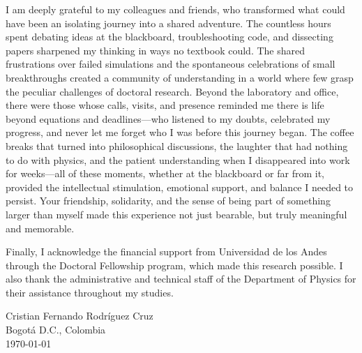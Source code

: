 \documentclass[11pt, letterpaper]{book}%
\begin{document}
\begin{acknowledgements}
I am deeply grateful to my colleagues and friends, who transformed what could have been an isolating journey into a shared adventure. The countless hours spent debating ideas at the blackboard, troubleshooting code, and dissecting papers sharpened my thinking in ways no textbook could. The shared frustrations over failed simulations and the spontaneous celebrations of small breakthroughs created a community of understanding in a world where few grasp the peculiar challenges of doctoral research. Beyond the laboratory and office, there were those whose calls, visits, and presence reminded me there is life beyond equations and deadlines—who listened to my doubts, celebrated my progress, and never let me forget who I was before this journey began. The coffee breaks that turned into philosophical discussions, the laughter that had nothing to do with physics, and the patient understanding when I disappeared into work for weeks—all of these moments, whether at the blackboard or far from it, provided the intellectual stimulation, emotional support, and balance I needed to persist. Your friendship, solidarity, and the sense of being part of something larger than myself made this experience not just bearable, but truly meaningful and memorable.

Finally, I acknowledge the financial support from Universidad de los Andes through the Doctoral Fellowship program, which made this research possible. I also thank the administrative and technical staff of the Department of Physics for their assistance throughout my studies.

\vspace{2cm}
\begin{flushright}
  Cristian Fernando Rodríguez Cruz\\
  Bogotá D.C., Colombia\\
  \today
\end{flushright}

\end{acknowledgements}
\end{document}
